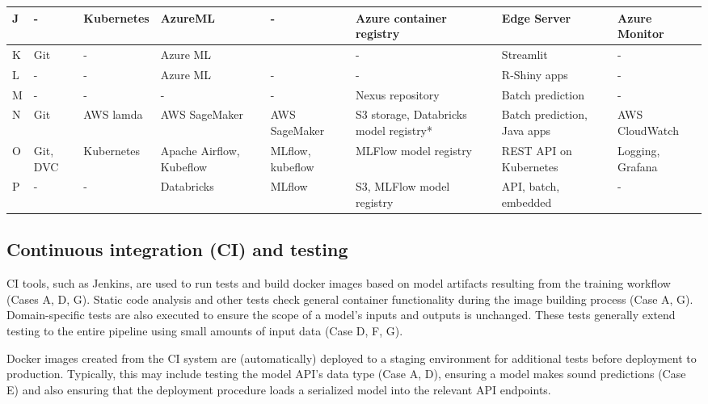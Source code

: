 \documentclass{IEEEcsmag}
\begin{document}
\begin{table*}[ht]
{\begin{tabular}{lp{}p{}p{2cm}p{2cm}p{}p{}p{2cm}}
         J & - & Kubernetes & AzureML & - & Azure container registry & Edge Server& Azure Monitor
          \\  \hline
          
         K & Git & -& Azure ML & & - & Streamlit & -
          \\  \hline
          
         L & -& -& Azure ML & - & - & R-Shiny apps & -
          \\  \hline
          
         M & - & -& -&- & 
         Nexus repository & Batch prediction & -
          \\  \hline
          
         N & Git & AWS lamda & AWS SageMaker & AWS SageMaker & S3 storage, Databricks model registry* & Batch prediction, Java apps & AWS CloudWatch
          \\  \hline
          
         O & Git, DVC & Kubernetes & Apache Airflow, Kubeflow & MLflow, kubeflow & MLFlow model registry & REST API on Kubernetes & Logging, Grafana
          \\  \hline
          
         P & - & - & Databricks & MLflow & S3, MLFlow model registry & API, batch, embedded & -
          \\  
         
\bottomrule

    \end{tabular}}
    \label{tab:databases}
\end{table*}
 


\subsection{Continuous integration (CI) and testing}

CI tools, such as Jenkins, are used to run tests and build docker images based on model artifacts resulting from the training workflow (Cases A, D, G). Static code analysis and other tests check general container functionality during the image building process (Case A, G). Domain-specific tests are also executed to ensure the scope of a model's inputs and outputs is unchanged. These tests generally extend testing to the entire pipeline using small amounts of input data (Case D, F, G). 

Docker images created from the CI system are (automatically) deployed to a staging environment for additional tests before deployment to production. Typically, this may include testing the model API's data type (Case A, D), ensuring a model makes sound predictions (Case E) and also ensuring that the deployment procedure loads a serialized model into the relevant API endpoints.
\end{document}
